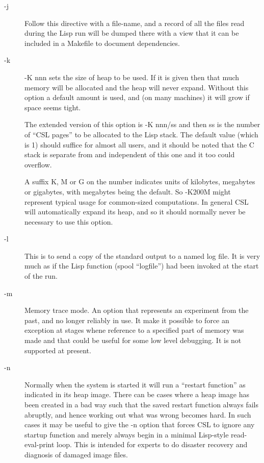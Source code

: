 \documentclass[a4paper,11pt]{article}
\begin{document}
\begin{description}
\item [{\ttfamily -j}] 
Follow this directive with a file-name, and a record of all the files read
during the Lisp run will be dumped there with a view that it can be included
in a Makefile to document dependencies.

\item [{\ttfamily -k}] 
{\ttfamily -K nnn} sets the size of heap to be used.  If it is given then that much
memory will be allocated and the heap will never expand.  Without this
option a default amount is used, and (on many machines) it will grow
if space seems tight.
  
The extended version of this option is {\ttfamily -K nnn/ss} and then ss is the
number of ``CSL pages'' to be allocated to the Lisp stack. The default
value (which is 1) should suffice for almost all users, and it should
be noted that the C stack is separate from and independent of this one and
it too could overflow.
  
A suffix K, M or G on the number indicates units of kilobytes, megabytes or
gigabytes, with megabytes being the default. So {\ttfamily -K200M} might
represent typical usage for common-sized computations. In general CSL
will automatically expand its heap, and so it should normally never be
necessary to use this option.

\item [{\ttfamily -l}] 
This is to send a copy of the standard output to a named log file. It is
very much as if the Lisp function {\ttfamily (spool ``logfile'')} had been
invoked at the start of the run.

\item [{\ttfamily -m}] 
Memory trace mode. An option that represents an experiment from the past,
and no longer reliably in use. It make it possible to force an
exception at stages whene reference to a specified part of memory was made
and that could be useful for some low level debugging. It is not supported
at present.

\item [{\ttfamily -n}] 
Normally when the system is started it will run a ``restart function'' as
indicated in its heap image. There can be cases where a heap image has been
created in a bad way such that the saved restart function always fails
abruptly, and hence working out what was wrong becomes hard. In such cases
it may be useful to give the {\ttfamily -n} option that forces CSL to
ignore any startup function and merely always begin in a minimal Lisp-style
read-eval-print loop. This is intended for experts to do disaster recovery
and diagnosis of damaged image files.


\end{description}
\end{document}
